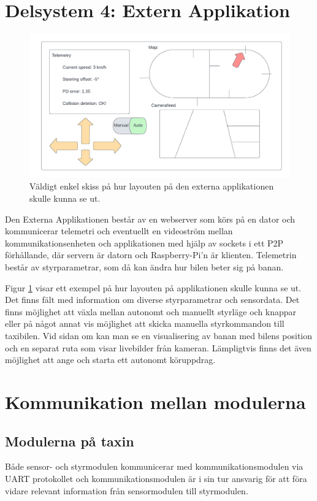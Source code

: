 \documentclass[10pt,oneside,swedish]{lips}
\begin{document}
\section{Delsystem 4: Extern Applikation}
\begin{figure}[htbp]
  \centering
  \includegraphics[width=.8\textwidth]{./Figures/appskiss.png}
  \caption{Väldigt enkel skiss på hur layouten på den externa applikationen skulle kunna se ut.}
  \label{fig:appskiss}
\end{figure}

Den Externa Applikationen består av en webserver som körs på en dator och kommunicerar telemetri och eventuellt en videoström mellan kommunikationsenheten och applikationen med hjälp av sockets i ett P2P förhållande, där servern är datorn och Raspberry-Pi'n är klienten. Telemetrin består av styrparametrar, som då kan ändra hur bilen beter sig på banan.

Figur \ref{fig:appskiss} visar ett exempel på hur layouten på applikationen skulle kunna se ut. Det finns fält med information om diverse styrparametrar och sensordata. Det finns möjlighet att växla mellan autonomt och manuellt styrläge och knappar eller på något annat vis möjlighet att skicka manuella styrkommandon till taxibilen. Vid sidan om kan man se en visualisering av banan med bilens position och en separat ruta som visar livebilder från kameran. Lämpligtvis finns det även möjlighet att ange och starta ett autonomt köruppdrag.

\section{Kommunikation mellan modulerna}

\subsection{Modulerna på taxin}
Både sensor- och styrmodulen kommunicerar med kommunikationsmodulen via UART protokollet och kommunikationsmodulen är i sin tur ansvarig för att föra vidare relevant information från sensormodulen till styrmodulen.
\end{document}
